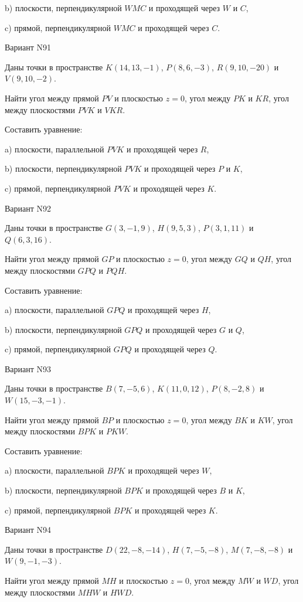 \documentclass[11pt]{report}
\begin{document}
b) плоскости, перпендикулярной $WMC$ и проходящей через $W$ и $C$,

c) прямой, перпендикулярной $WMC$ и проходящей через $C$.

Вариант N91

Даны точки в пространстве
$K(14, 13, -1)$, $P(8, 6, -3)$, $R(9, 10, -20)$ и
$V(9, 10, -2)$.

Найти угол между прямой $PV$ и плоскостью $z = 0$, угол между $PK$ и $KR$, угол между плоскостями $PVK$ 
и $VKR$.

Составить уравнение: 

a) плоскости, параллельной $PVK$ и проходящей через $R$,

b) плоскости, перпендикулярной $PVK$ и проходящей через $P$ и $K$,

c) прямой, перпендикулярной $PVK$ и проходящей через $K$.

Вариант N92

Даны точки в пространстве
$G(3, -1, 9)$, $H(9, 5, 3)$, $P(3, 1, 11)$ и
$Q(6, 3, 16)$.

Найти угол между прямой $GP$ и плоскостью $z = 0$, угол между $GQ$ и $QH$, угол между плоскостями $GPQ$ 
и $PQH$.

Составить уравнение: 

a) плоскости, параллельной $GPQ$ и проходящей через $H$,

b) плоскости, перпендикулярной $GPQ$ и проходящей через $G$ и $Q$,

c) прямой, перпендикулярной $GPQ$ и проходящей через $Q$.

Вариант N93

Даны точки в пространстве
$B(7, -5, 6)$, $K(11, 0, 12)$, $P(8, -2, 8)$ и
$W(15, -3, -1)$.

Найти угол между прямой $BP$ и плоскостью $z = 0$, угол между $BK$ и $KW$, угол между плоскостями $BPK$ 
и $PKW$.

Составить уравнение: 

a) плоскости, параллельной $BPK$ и проходящей через $W$,

b) плоскости, перпендикулярной $BPK$ и проходящей через $B$ и $K$,

c) прямой, перпендикулярной $BPK$ и проходящей через $K$.

Вариант N94

Даны точки в пространстве
$D(22, -8, -14)$, $H(7, -5, -8)$, $M(7, -8, -8)$ и
$W(9, -1, -3)$.

Найти угол между прямой $MH$ и плоскостью $z = 0$, угол между $MW$ и $WD$, угол между плоскостями $MHW$ 
и $HWD$.
\end{document}
